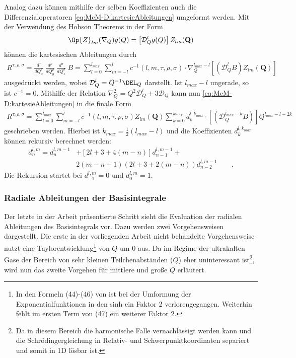 Analog dazu können mithilfe der selben Koeffizienten auch die 
Differenzialoperatoren \ref{eq:McM-D:kartesieAbleitungen} umgeformt werden. 
Mit der Verwendung des Hobson Theorems in der Form
%
\begin{align}\label{eq:Hobson}
\Op{Z}_{lm}(\nabla_Q)g(Q)=\left[\mathcal{D}^l_Qg(Q)\right]Z_{lm}(\textbf{Q}) 
\end{align}
%
können die kartesischen Ableitungen durch 
%
\begin{align}
R^{\tau,\rho,\sigma}=\frac{d^\tau}{dQ^\tau_x}\ 
\frac{d^\rho}{dQ^\rho_y}\ \frac{d^\sigma}{dQ^\sigma_z}\ 
B=\sum_{l=0}^{l_{max}}\sum_{m=-l}^{l}c^{-1}(l,m,\tau,\rho,\sigma)\cdot
 \nabla_Q^{l_{max}-l}\left[(\mathcal{D}_Q^lB)Z_{lm}(\textbf{Q})\right]
\end{align}
%
ausgedrückt werden, wobei $\mathcal{D}^l_Q=Q^{-1}\DEL_Q$ darstellt. Ist  
$l_{max}-l$ 
ungerade, so ist $c^{-1}=0$. Mithilfe der Relation 
$\nabla_Q^2=Q^2\mathcal{D}^l_Q+3\mathcal{D}_Q$ 
kann nun \ref{eq:McM-D:kartesieAbleitungen} in die finale Form
%
\begin{align}\label{eq:final:Hobson}
R^{\tau,\rho,\sigma}=\sum_{l=0}^{l_{max}}\sum_{m=-l}^{l}c^{-1}(l,m,\tau,\rho,\sigma)Z_{lm}(\textbf{Q})
 \sum_{k=0}^{k_{max}}d_k^{l,k_{max}} \cdot 
\left[(\mathcal{D}_Q^{l_{max}-k}B)\right]Q^{l_{max}-l-2k}
\end{align}
%
geschrieben werden. Hierbei ist $k_{max}=\frac{1}{2}(l_{max}-l)$ und die 
Koeffizienten $d_k^{l,k_{max}}$ können rekursiv berechnet werden:
%
\begin{align}\nonumber
d_n^{l,m}=d_n^{l,m-1} &+\left[2l+3+4(m-n)\right]d_{n-1}^{l,m-1}+\\ 
\label{eq:rek_d}
&2(m-n+1)(2l+3+2(m-n))d_{n-2}^{l,m-1} \qquad.
\end{align} 
%
Die Rekursion startet bei $d_{-1}^{l,m}=0$ und $d_0^{l,m}=1$.
%
%
%
\subsubsection{Radiale Ableitungen der Basisintegrale}
%
Der letzte in der Arbeit \cite{av:1a} präsentierte Schritt 
sieht die 
Evaluation der radialen Ableitungen des Basisintegrals vor. Dazu werden zwei 
Vorgehensweisen dargestellt. Die erste in der vorliegenden 
Arbeit nicht 
behandelte Vorgehensweise nutzt eine Taylorentwicklung\footnote{In den Formeln 
(44)-(46) von \cite{av:1a} ist bei der Umformung der Exponentialfunktionen in 
den sinh ein Faktor 2 verlorengegangen. Weiterhin fehlt im 
ersten Term von 
(47) ein weiterer Faktor 2.} von $Q$ um 0 aus. Da im Regime der ultrakalten 
Gase der Bereich von sehr kleinen Teilchenabständen ($Q$) eher uninteressant 
ist\footnote{Da in diesem Bereich die harmonische Falle vernachlässigt werden 
kann und die Schrödingergleichung in Relativ- und Schwerpunktkoordinaten 
separiert und somit in 1D lösbar ist.}, wird nun das zweite Vorgehen für 
mittlere und große $Q$ erläutert.\\

